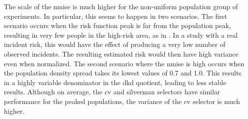 The scale of the \gls{nmise} is much higher for the non-uniform population group of experiments.
In particular, this seems to happen in two scenarios.
The first scenario occurs when the \gls{risk} function peak is far from the population peak, resulting in very few people in the high-risk area,
as in .
In a study with a real \gls{incident} \gls{risk},
this would have the effect of producing a very low number of observed \glspl{incident}.
The resulting estimated \gls{risk} would then have high variance even when normalized.
The second scenario where the \gls{nmise} is high occurs when the population density \gls{spread} takes its lowest values of 0.7 and 1.0.
This results in a highly variable denominator in the \gls{dkd} quotient,
leading to less stable results.
Although on average, the \gls{cv} and \gls{silverman} selectors have similar performance for the peaked populations,
the variance of the \gls{cv} selector is much higher.

